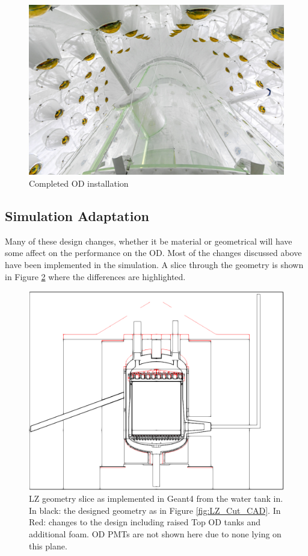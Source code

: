 \begin{figure}[!htbp]
\includegraphics[width=\textwidth]{Figures/Construction/od_complete.jpg}
\centering
\caption{Completed OD installation}
\label{fig:complete_od}
\end{figure}



\subsection{Simulation Adaptation}
\par
Many of these design changes, whether it be material or geometrical will have some affect on the performance on the OD.
Most of the changes discussed above have been implemented in the simulation.
A slice through the geometry is shown in Figure \ref{fig:Geometry_Differences} where the differences are highlighted.

\begin{figure}[!htbp]
\includegraphics[width=\textwidth]{Figures/Geometry/geometry_differences_black_and_white.png}
\centering
\caption{LZ geometry slice as implemented in Geant4 from the water tank in. In black: the designed geometry as in Figure \ref{fig:LZ_Cut_CAD}. In Red: changes to the design including raised Top OD tanks and additional foam. OD PMTs are not shown here due to none lying on this plane.}
\label{fig:Geometry_Differences}
\end{figure}


